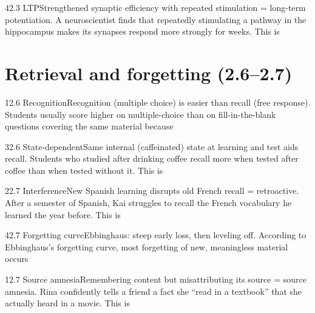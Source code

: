 \documentclass[11pt]{article}
\begin{document}
\begin{q}{4}{2.3 LTP}{Strengthened synaptic efficiency with repeated stimulation = long-term potentiation.}
A neuroscientist finds that repeatedly stimulating a pathway in the hippocampus makes its synapses respond more strongly for weeks. This is
\end{q}

\section{Retrieval and forgetting (2.6--2.7)}

\begin{q}{1}{2.6 Recognition}{Recognition (multiple choice) is easier than recall (free response).}
Students usually score higher on multiple-choice than on fill-in-the-blank questions covering the same material because
\end{q}

\begin{q}{3}{2.6 State-dependent}{Same internal (caffeinated) state at learning and test aids recall.}
Students who studied after drinking coffee recall more when tested after coffee than when tested without it. This is
\end{q}

\begin{q}{2}{2.7 Interference}{New Spanish learning disrupts old French recall = retroactive.}
After a semester of Spanish, Kai struggles to recall the French vocabulary he learned the year before. This is
\end{q}

\begin{q}{4}{2.7 Forgetting curve}{Ebbinghaus: steep early loss, then leveling off.}
According to Ebbinghaus's forgetting curve, most forgetting of new, meaningless material occurs
\end{q}

\begin{q}{1}{2.7 Source amnesia}{Remembering content but misattributing its source = source amnesia.}
Rina confidently tells a friend a fact she ``read in a textbook'' that she actually heard in a movie. This is
\end{q}
\end{document}
